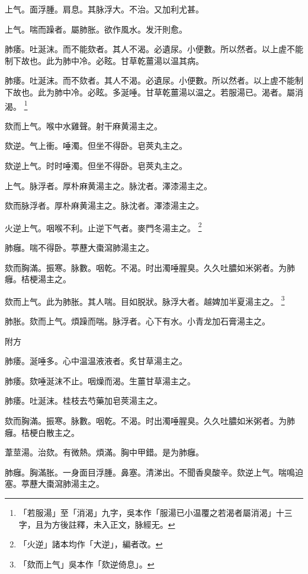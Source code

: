 上气。面浮腫。肩息。其脉浮大。不治。又加利尤甚。

上气。喘而躁者。屬肺胀。欲作風水。发汗則愈。

肺痿。吐涎沫。而不能欬者。其人不渴。必遺尿。小便數。所以然者。以上虗不能制下故也。此为肺中冷。必眩。甘草乾薑湯以温其病。{\wuben}

肺痿。吐涎沫。而不欬者。其人不渴。必遺尿。小便數。所以然者。以上虗不能制下故也。此为肺中冷。必眩。多涎唾。甘草乾薑湯以温之。若服湯已。渴者。屬消渴。{\dengben}
	\footnote{
		「若服湯」至「消渴」九字，吳本作「服湯已小温覆之若渴者屬消渴」十三字，且为方後註釋，未入正文，脉經无。
		}

欬而上气。喉中水雞聲。射干麻黄湯主之。

欬逆。气上衝。唾濁。但坐不得卧。皂莢丸主之。{\wuben}

欬逆上气。时时唾濁。但坐不得卧。皂莢丸主之。{\dengben}

上气。脉浮者。厚朴麻黄湯主之。脉沈者。澤漆湯主之。{\wuben}

欬而脉浮者。厚朴麻黄湯主之。脉沈者。澤漆湯主之。{\dengben}


火逆上气。咽喉不利。止逆下气者。麥門冬湯主之。
	\footnote{「火逆」諸本均作「大逆」，編者改。}

肺癰。喘不得卧。葶藶大棗瀉肺湯主之。

欬而胸滿。振寒。脉數。咽乾。不渴。时出濁唾腥臭。久久吐膿如米粥者。为肺癰。桔梗湯主之。

欬而上气。此为肺胀。其人喘。目如脱狀。脉浮大者。越婢加半夏湯主之。
	\footnote{「欬而上气」吳本作「欬逆倚息」。}

肺胀。欬而上气。煩躁而喘。脉浮者。心下有水。小青龙加石膏湯主之。

附方

肺痿。涎唾多。心中温温液液者。炙甘草湯主之。

肺痿。欬唾涎沫不止。咽燥而渴。生薑甘草湯主之。

肺痿。吐涎沫。桂枝去芍藥加皂莢湯主之。

欬而胸滿。振寒。脉數。咽乾。不渴。时出濁唾腥臭。久久吐膿如米粥者。为肺癰。桔梗白散主之。

葦莖湯。治欬。有微熱。煩滿。胸中甲錯。是为肺癰。

肺癰。胸滿胀。一身面目浮腫。鼻塞。清涕出。不聞香臭酸辛。欬逆上气。喘鳴迫塞。葶藶大棗瀉肺湯主之。

